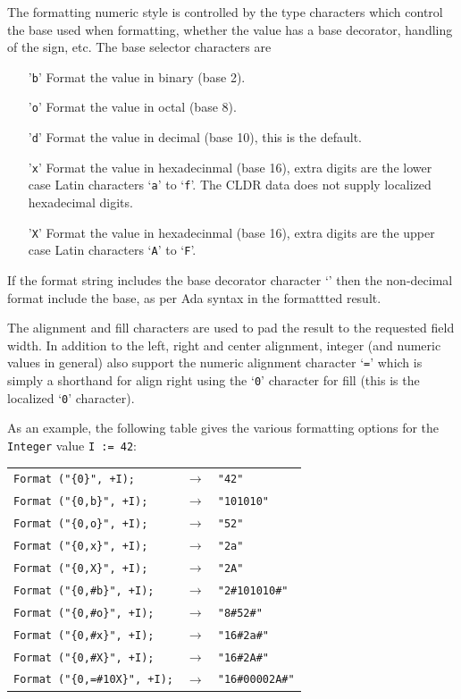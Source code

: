 The formatting numeric style is controlled by the type characters which
control the base used when formatting, whether the value has a base
decorator, handling of the sign, etc.  The base selector characters are
\begin{itemize}
\item['\texttt{b}'] Format the value in binary (base 2).
\item['\texttt{o}'] Format the value in octal (base 8).
\item['\texttt{d}'] Format the value in decimal (base 10), this is the default.
\item['\texttt{x}'] Format the value in hexadecinmal (base 16), extra digits
    are the lower case Latin characters `\texttt{a}' to `\texttt{f}'.  The
    CLDR data does not supply localized hexadecimal digits.
\item['\texttt{X}'] Format the value in hexadecinmal (base 16), extra digits
    are the upper case Latin characters `\texttt{A}' to `\texttt{F}'.
\end{itemize}

If the format string includes the base decorator character `\texttt{}'
then the non-decimal format include the base, as per Ada syntax in the
formattted result.

The alignment and fill characters are used to pad the result to the requested
field width.  In addition to the left, right and center alignment, integer
(and numeric values in general) also support the numeric alignment
character `\texttt{=}' which is simply a shorthand for align right using the
`\texttt{0}' character for fill (this is the localized `\texttt{0}' character).

As an example, the following table gives the various formatting options
for the \texttt{Integer} value \verb|I := 42|:
\begin{center}
\begin{tabular}{lll}
\verb|Format ("{0}", +I);| & $\rightarrow$ & \verb|"42"|\\
\verb|Format ("{0,b}", +I);| & $\rightarrow$ & \verb|"101010"|\\
\verb|Format ("{0,o}", +I);| & $\rightarrow$ & \verb|"52"|\\
\verb|Format ("{0,x}", +I);| & $\rightarrow$ & \verb|"2a"|\\
\verb|Format ("{0,X}", +I);| & $\rightarrow$ & \verb|"2A"|\\
\verb|Format ("{0,#b}", +I);| & $\rightarrow$ & \verb|"2#101010#"|\\
\verb|Format ("{0,#o}", +I);| & $\rightarrow$ & \verb|"8#52#"|\\
\verb|Format ("{0,#x}", +I);| & $\rightarrow$ & \verb|"16#2a#"|\\
\verb|Format ("{0,#X}", +I);| & $\rightarrow$ & \verb|"16#2A#"|\\
\verb|Format ("{0,=#10X}", +I);| & $\rightarrow$ & \verb|"16#00002A#"|
\end{tabular}
\end{center}

